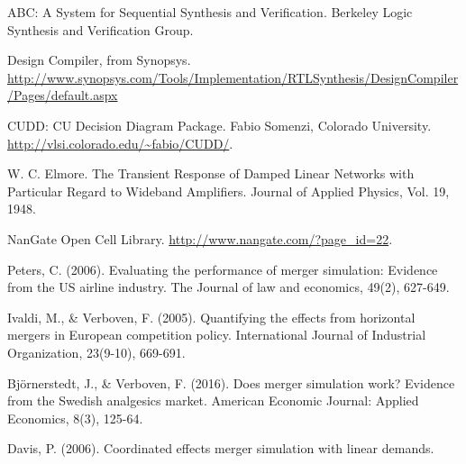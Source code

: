 \documentclass[12pt]{article}
\begin{document}
\newpage
\begin{thebibliography}{9}

ABC: A System for Sequential Synthesis and Verification. Berkeley Logic Synthesis and Verification Group.
 
Design Compiler, from Synopsys. \url{http://www.synopsys.com/Tools/Implementation/RTLSynthesis/DesignCompiler/Pages/default.aspx}

CUDD: CU Decision Diagram Package. Fabio Somenzi, Colorado University. \url{http://vlsi.colorado.edu/~fabio/CUDD/}.

W. C. Elmore. The Transient Response of Damped Linear Networks with Particular Regard to Wideband Amplifiers. Journal of Applied Physics, Vol. 19, 1948.

NanGate Open Cell Library. \url{http://www.nangate.com/?page_id=22}.

Peters, C. (2006). Evaluating the performance of merger simulation: Evidence from the US airline industry. The Journal of law and economics, 49(2), 627-649.

Ivaldi, M., \& Verboven, F. (2005). Quantifying the effects from horizontal mergers in European competition policy. International Journal of Industrial Organization, 23(9-10), 669-691.

Bj\"{o}rnerstedt, J., \& Verboven, F. (2016). Does merger simulation work? Evidence from the Swedish analgesics market. American Economic Journal: Applied Economics, 8(3), 125-64.

Davis, P. (2006). Coordinated effects merger simulation with linear demands.
\end{thebibliography}


\newpage
\listoffigures

\newpage
\listoftables

%
\end{document}
